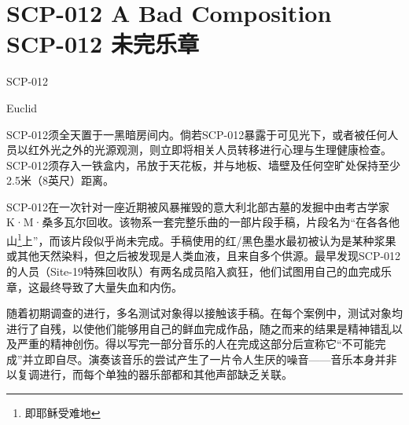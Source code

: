 \chapter[SCP-012 未完乐章]{
    SCP-012 A Bad Composition\\
    SCP-012 未完乐章
}

\label{chap:SCP-012}

SCP-012

Euclid

SCP-012须全天置于一黑暗房间内。倘若SCP-012暴露于可见光下，或者被任何人员以红外光之外的光源观测，则立即将相关人员转移进行心理与生理健康检查。SCP-012须存入一铁盒内，吊放于天花板，并与地板、墙壁及任何空旷处保持至少2.5米（8英尺）距离。

SCP-012在一次针对一座近期被风暴摧毁的意大利北部古墓的发掘中由考古学家K·M·桑多瓦尔回收。该物系一套完整乐曲的一部片段手稿，片段名为“在各各他山\footnote{即耶稣受难地}上”，而该片段似乎尚未完成。手稿使用的红\slash 黑色墨水最初被认为是某种浆果或其他天然染料，但之后被发现是人类血液，且来自多个供源。最早发现SCP-012的人员（Site-19特殊回收队）有两名成员陷入疯狂，他们试图用自己的血完成乐章，这最终导致了大量失血和内伤。

随着初期调查的进行，多名测试对象得以接触该手稿。在每个案例中，测试对象均进行了自残，以使他们能够用自己的鲜血完成作品，随之而来的结果是精神错乱以及严重的精神创伤。得以写完一部分音乐的人在完成这部分后宣称它“不可能完成”并立即自尽。演奏该音乐的尝试产生了一片令人生厌的噪音——音乐本身并非以复调进行，而每个单独的器乐部都和其他声部缺乏关联。
